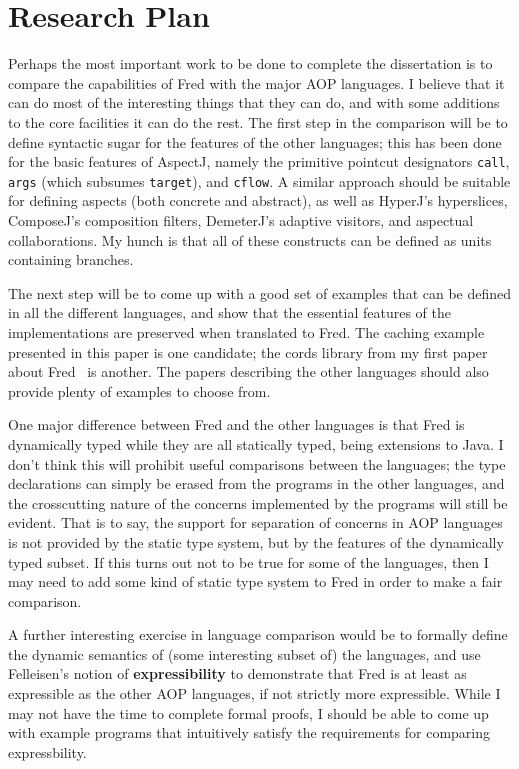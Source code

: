 \documentclass{article}
\newcommand{\defn}[1]{\textbf{#1}}
\newcommand{\code}[1]{\texttt{#1}}
\begin{document}
\section{Research Plan}
\label{research}

Perhaps the most important work to be done to complete the
dissertation is to compare the capabilities of Fred with the major AOP
languages.  I believe that it can do most of the interesting things
that they can do, and with some additions to the core facilities it
can do the rest.  The first step in the comparison will be to define
syntactic sugar for the features of the other languages; this has been
done for the basic features of AspectJ, namely the primitive pointcut
designators \code{call}, \code{args} (which subsumes \code{target}),
and \code{cflow}.  A similar approach should be suitable for defining
aspects (both concrete and abstract), as well as HyperJ's hyperslices,
ComposeJ's composition filters, DemeterJ's adaptive visitors, and
aspectual collaborations.  My hunch is that all of these constructs
can be defined as units containing branches.

The next step will be to come up with a good set of examples that can
be defined in all the different languages, and show that the essential
features of the implementations are preserved when translated to Fred.
The caching example presented in this paper is one candidate; the
cords library from my first paper about Fred~\cite{Fred} is another.
The papers describing the other languages should also provide plenty
of examples to choose from.

One major difference between Fred and the other languages is that Fred
is dynamically typed while they are all statically typed, being
extensions to Java.  I don't think this will prohibit useful
comparisons between the languages; the type declarations can simply be
erased from the programs in the other languages, and the crosscutting
nature of the concerns implemented by the programs will still be
evident.  That is to say, the support for separation of concerns in
AOP languages is not provided by the static type system, but by the
features of the dynamically typed subset.  If this turns out not to be
true for some of the languages, then I may need to add some kind of
static type system to Fred in order to make a fair comparison.

A further interesting exercise in language comparison would be to
formally define the dynamic semantics of (some interesting subset of)
the languages, and use Felleisen's notion of \defn{expressibility} to
demonstrate that Fred is at least as expressible as the other AOP
languages, if not strictly more expressible.  While I may not have the
time to complete formal proofs, I should be able to come up with
example programs that intuitively satisfy the requirements for
comparing expressbility.
\end{document}
